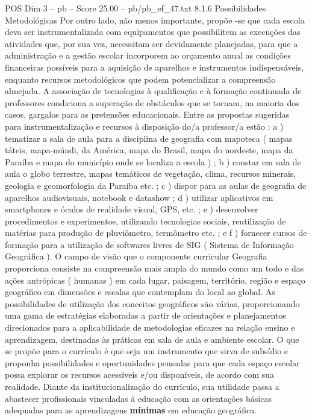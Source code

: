 \begin{textsample}{POS Dim 3 – pb – Score 25.00 – pb/pb\_ef\_47.txt}  \label{ex:f3_pos_084}
8.1.6 Possibilidades Metodológicas Por outro lado, não menos importante, propõe -se que cada escola deva ser instrumentalizada com equipamentos que possibilitem as execuções das atividades que, por sua vez, necessitam ser devidamente planejadas, para que a administração e a gestão escolar incorporem ao orçamento anual as condições financeiras possíveis para a aquisição de aparelhos e instrumentos indispensáveis, enquanto recursos metodológicos que podem potencializar a compreensão almejada.
A associação de tecnologias à qualificação e à formação continuada de professores condiciona a superação de obstáculos que se tornam, na maioria dos casos, gargalos para as pretensões educacionais.
Entre as propostas sugeridas para instrumentalização e recursos à disposição do/a professor/a estão : a ) tematizar a sala de aula para a disciplina de geografia com mapoteca ( mapas táteis, mapa-múndi, da América, mapa do Brasil, mapa do nordeste, mapa da Paraíba e mapa do município onde se localiza a escola ) ; b ) constar em sala de aula o globo terrestre, mapas temáticos de vegetação, clima, recursos minerais, geologia e geomorfologia da Paraíba etc. ; c ) dispor para as aulas de geografia de aparelhos audiovisuais, notebook e datashow ; d ) utilizar aplicativos em smartphones e óculos de realidade visual, GPS, etc. ; e ) desenvolver procedimentos e experimentos, utilizando tecnologias sociais, reutilização de matérias para produção de pluviômetro, termômetro etc. ; e f ) fornecer cursos de formação para a utilização de softwares livres de SIG ( Sistema de Informação Geográfica ).
O campo de visão que o componente curricular Geografia proporciona consiste na compreensão mais ampla do mundo como um todo e das ações antrópicas ( humanas ) em cada lugar, paisagem, território, região e espaço geográfico em dimensões e escalas que contemplam do local ao global.
As possibilidades de utilização dos conceitos geográficos são várias, proporcionando uma gama de estratégias elaboradas a partir de orientações e planejamentos direcionados para a aplicabilidade de metodologias eficazes na relação ensino e aprendizagem, destinadas às práticas em sala de aula e ambiente escolar.
O que se propõe para o currículo é que seja um instrumento que sirva de subsídio e proponha possibilidades e oportunidades pensadas para que cada espaço escolar possa explorar os recursos acessíveis e/ou disponíveis, de acordo com sua realidade.
Diante da institucionalização do currículo, sua utilidade passa a abastecer profissionais vinculadas à educação com as orientações básicas adequadas para as aprendizagens \textbf{mínimas} em educação geográfica.

\end{textsample}

